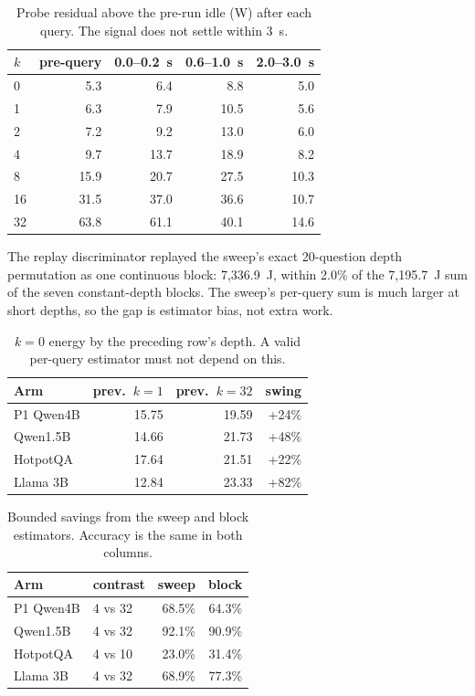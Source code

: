 \begin{table}[pos=htbp]
  \centering
  \caption{Probe residual above the pre-run idle (W) after each query. The signal does not settle within 3~s.}
  \label{tab:s5bprobe}
  \footnotesize
  \begin{tabular}{@{}lrrrr@{}}
    \toprule
    $k$ & pre-query & 0.0--0.2~s & 0.6--1.0~s & 2.0--3.0~s \\
    \midrule
    0 & 5.3 & 6.4 & 8.8 & 5.0 \\
    1 & 6.3 & 7.9 & 10.5 & 5.6 \\
    2 & 7.2 & 9.2 & 13.0 & 6.0 \\
    4 & 9.7 & 13.7 & 18.9 & 8.2 \\
    8 & 15.9 & 20.7 & 27.5 & 10.3 \\
    16 & 31.5 & 37.0 & 36.6 & 10.7 \\
    32 & 63.8 & 61.1 & 40.1 & 14.6 \\
    \bottomrule
  \end{tabular}
\end{table}

The replay discriminator replayed the sweep's exact 20-question depth permutation
as one continuous block: 7{,}336.9~J, within 2.0\% of the 7{,}195.7~J sum of the
seven constant-depth blocks. The sweep's per-query sum is much larger at short
depths, so the gap is estimator bias, not extra work.

\begin{table}[pos=htbp]
  \centering
  \caption{$k=0$ energy by the preceding row's depth. A valid per-query estimator must not depend on this.}
  \label{tab:s5bneighbour}
  \footnotesize
  \begin{tabular}{@{}lrrr@{}}
    \toprule
    Arm & prev.\ $k=1$ & prev.\ $k=32$ & swing \\
    \midrule
    P1 Qwen4B & 15.75 & 19.59 & +24\% \\
    Qwen1.5B & 14.66 & 21.73 & +48\% \\
    HotpotQA & 17.64 & 21.51 & +22\% \\
    Llama 3B & 12.84 & 23.33 & +82\% \\
    \bottomrule
  \end{tabular}
\end{table}

\begin{table}[pos=htbp]
  \centering
  \caption{Bounded savings from the sweep and block estimators. Accuracy is the same in both columns.}
  \label{tab:s5bbounded}
  \footnotesize
  \begin{tabular}{@{}llrr@{}}
    \toprule
    Arm & contrast & sweep & block \\
    \midrule
    P1 Qwen4B & 4 vs 32 & 68.5\% & 64.3\% \\
    Qwen1.5B & 4 vs 32 & 92.1\% & 90.9\% \\
    HotpotQA & 4 vs 10 & 23.0\% & 31.4\% \\
    Llama 3B & 4 vs 32 & 68.9\% & 77.3\% \\
    \bottomrule
  \end{tabular}
\end{table}

